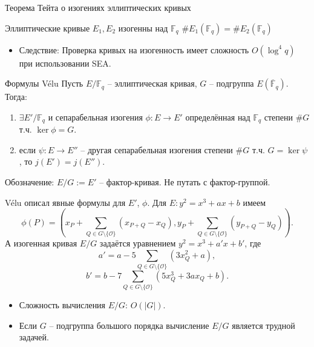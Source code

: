 \documentclass{beamer}
\begin{document}
\begin{frame}{Теорема Тейта о изогениях эллиптических кривых}
    \begin{center}
        Эллиптические кривые $E_1, E_2$ изогенны над $\mathbb{F}_q$ \structure{$\iff$} $\#E_1(\mathbb{F}_q) = \#E_2(\mathbb{F}_q)$
    \end{center}
    \begin{itemize}
        \item Следствие: Проверка кривых на изогенность имеет сложность $O(\log^4{q})$ при использовании SEA.
    \end{itemize}
\end{frame}

\begin{frame}{Формулы V\'{e}lu}
Пусть $E/\mathbb{F}_q$ -- эллиптическая кривая, $G$ -- подгруппа $E(\overline{\mathbb{F}}_q)$. Тогда:
\begin{enumerate}
    \item $\exists E'/\mathbb{F}_q$ и сепарабельная изогения $\phi: E \rightarrow E'$ определённая над $\mathbb{F}_q$ степени $\#G$ т.ч. $\ker\phi = G$.
    \item если $\psi: E \rightarrow E''$ -- другая сепарабельная изогения степени $\#G$ т.ч. $G = \ker\psi$, то $j(E') = j(E'')$.
\end{enumerate}
Обозначение: $E/G := E'$ -- фактор-кривая. Не путать с фактор-группой.
\end{frame}

\begin{frame}
V\'{e}lu описал явные формулы для $E'$, $\phi$. Для $E: y^2 = x^3 + a x + b$ имеем
\[
\phi(P)
=
\left(
  x_P + \sum_{Q \in G \setminus \{\mathcal{O}\}} \left( x_{P+Q} - x_Q \right),
  y_P + \sum_{Q \in G \setminus \{ \mathcal{O} \}} \left( y_{P+Q} - y_Q \right)
\right).
\]
А изогенная кривая $E/G$ задаётся уравнением $y^2 = x^3 + a' x + b'$, где
\[
a' = a - 5 \sum_{Q \in G \setminus \{ \mathcal{O} \}} \left( 3 x_Q^2 + a \right),
\]
\[
b' = b - 7 \sum_{Q \in G \setminus \{\mathcal{O}\}} \left(
5 x_Q^3 + 3 a x_Q + b
\right).
\]
\end{frame}

\begin{frame}
\begin{itemize}
  \item Сложность вычисления $E/G$: $O(|G|)$.
  \item Если $G$ -- подгруппа большого порядка вычисление $E/G$ является трудной задачей.
\end{itemize}
\end{frame}
\end{document}
